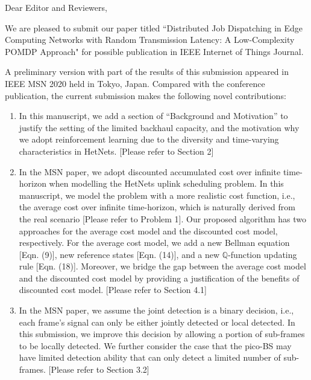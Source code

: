 \documentclass[10pt,draftclsnofoot,onecolumn]{article}
\newcommand{\fixit}[1]{{\leavevmode\color{red}#1}}
\begin{document}
Dear Editor and Reviewers,

We are pleased to submit our paper titled ``Distributed Job Dispatching in Edge Computing Networks with Random Transmission Latency: A Low-Complexity POMDP Approach" for possible publication in IEEE Internet of Things Journal.

A preliminary version with part of the results of this submission appeared in IEEE MSN 2020 held in Tokyo, Japan.
Compared with the conference  publication, the current submission makes the following novel contributions:
\begin{enumerate}
\item In this manuscript, \fixit{we add a section of ``Background and Motivation'' to justify the setting of the limited backhaul capacity, and the motivation why we adopt reinforcement learning due to the diversity and time-varying characteristics in HetNets. [Please refer to Section 2]}
\item In the MSN paper, \fixit{we adopt discounted accumulated cost over infinite time-horizon when modelling the HetNets uplink scheduling problem. In this manuscript, we model the problem with a more realistic cost function, i.e., the average cost over infinite time-horizon, which is naturally derived from the real scenario [Please refer to Problem 1]. Our proposed algorithm has two approaches for the average cost model and the discounted cost model, respectively. For the average cost model, we add a new Bellman equation [Eqn. (9)], new reference states [Eqn. (14)], and a new $\mathbb Q$-function updating rule [Eqn. (18)]. Moreover, we bridge the gap between the average cost model and the discounted cost model by providing a justification of the benefits of discounted cost model. [Please refer to Section 4.1]}
\item In the MSN paper, \fixit{we assume the joint detection is a binary decision, i.e., each frame's signal can only be either jointly detected or local detected. In this submission, we improve this decision by allowing a portion of sub-frames to be locally detected. We further consider the case that the pico-BS may have limited detection ability that can only detect a limited number of sub-frames. [Please refer to Section 3.2]}

\end{enumerate}
\end{document}

